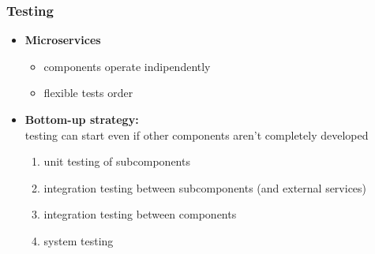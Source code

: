 
\begin{frame}
	\frametitle{Testing}
	\begin{itemize}
		\item \textbf{Microservices}
		\begin{itemize}
			\item components operate indipendently
			\item flexible tests order
		\end{itemize}
		\pause
		\item \textbf{Bottom-up strategy:} \\ testing can start even if other components aren't completely developed
		\begin{enumerate}
			\item unit testing of subcomponents
			\item integration testing between subcomponents (and external services)
			\item integration testing between components
			\item system testing
		\end{enumerate}
	\end{itemize}	
\end{frame}
